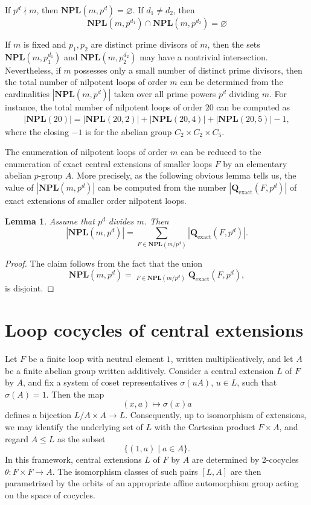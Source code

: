 \documentclass[12pt,a4paper]{amsart}
\newtheorem{lemma}[theorem]{Lemma}
\theoremstyle{definition}
\newcommand{\boldQexact}{\mathbf{Q}_{\mathrm{exact}}}
\newcommand{\NPL}{\mathbf{NPL}}
\begin{document}
If $p^d \nmid m$, then $\NPL(m,p^{d})=\varnothing$. If $d_1\neq d_2$, then
\[
\NPL(m,p^{d_1}) \cap \NPL(m,p^{d_2}) = \varnothing
\]

If $m$ is fixed and $p_1,p_2$ are distinct prime divisors of $m$, then the sets $\NPL(m,p_1^{d_1})$ and $\NPL(m,p_2^{d_2})$ may have a nontrivial intersection. Nevertheless, if $m$ possesses only a small number of distinct prime divisors, then the total number of nilpotent loops of order $m$ can be determined from the cardinalities $|\NPL(m,p^{d})|$ taken over all prime powers $p^d$ dividing $m$. For instance, the total number of nilpotent loops of order $20$ can be computed as
\begin{align*}
|\NPL(20)| = |\NPL(20,2)| + |\NPL(20,4)| + |\NPL(20,5)| -1,
\end{align*}
where the closing $-1$ is for the abelian group $C_2\times C_2 \times C_5$. 


The enumeration of nilpotent loops of order $m$ can be reduced to the enumeration of exact central extensions of smaller loops $F$ by an elementary abelian $p$-group $A$. More precisely, as the following obvious lemma tells us, the value of $|\NPL(m,p^d)|$ can be computed from the number $|\boldQexact(F,p^d)|$ of exact extensions of smaller order nilpotent loops. 

\begin{lemma}\label{lem:nilpot-decomposition}
Assume that $p^{d}$ divides $m$. Then
\[
|\NPL(m,p^{d})|
=
\sum_{F\in\NPL(m/p^{d})}
|\boldQexact(F,p^{d})|. 
\]
\end{lemma}
\begin{proof}
The claim follows from the fact that the union
\[
\NPL(m,p^{d})
=
\mathop{\dot{\bigcup}}_{F\in\NPL(m/p^{d})}
\boldQexact(F,p^{d}),
\]
is disjoint.
\end{proof}



\section{Loop cocycles of central extensions}

Let $F$ be a finite loop with neutral element $1$, written multiplicatively, and let $A$ be a finite abelian group written additively. Consider a central extension $L$ of $F$ by $A$, and fix a system of coset representatives $\sigma(uA)$, $u \in L$, such that $\sigma(A) = 1$. Then the map
\[
(x,a) \mapsto \sigma(x)a
\]
defines a bijection $L/A \times A \to L$. Consequently, up to isomorphism of extensions, we may identify the underlying set of $L$ with the Cartesian product $F \times A$, and regard $A \leq L$ as the subset
\[
\{(1,a) \mid a \in A\}.
\]
In this framework, central extensions $L$ of $F$ by $A$ are determined by 2-cocycles $\theta: F \times F \to A$. The isomorphism classes of such pairs $[L, A]$ are then parametrized by the orbits of an appropriate affine automorphism group acting on the space of cocycles.
\end{document}
